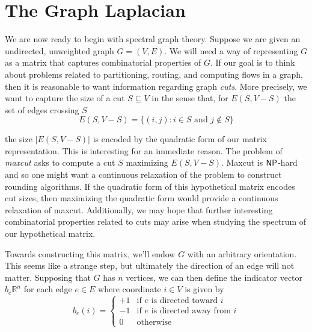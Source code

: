 
\section{The Graph Laplacian}

We are now ready to begin with spectral graph theory. Suppose we are given an undirected, unweighted graph $G = (V, E)$. We will need a way of representing $G$ as a matrix that captures combinatorial properties of $G$. If our goal is to think about problems related to partitioning, routing, and computing flows in a graph, then it is reasonable to want information regarding graph \emph{cuts}. More precisely, we want to capture the size of a cut $S \subseteq V$ in the sense that, for $E(S, V - S)$ the set of edges crossing $S$
\begin{equation*}
E(S, V - S) = \{ (i, j) : i \in S \text{ and } j \notin S \}
\end{equation*}

the size $\lvert E(S, V - S) \rvert$ is encoded by the quadratic form of our matrix representation. This is interesting for an immediate reason. The problem of \emph{maxcut} asks to compute a cut $S$ maximizing $E(S, V - S)$. Maxcut is $\mathsf{NP}$-hard and so one might want a continuous relaxation of the problem to construct rounding algorithms. If the quadratic form of this hypothetical matrix encodes cut sizes, then maximizing the quadratic form would provide a continuous relaxation of maxcut. Additionally, we may hope that further interesting combinatorial properties related to cuts may arise when studying the spectrum of our hypothetical matrix.

Towards constructing this matrix, we'll endow $G$ with an arbitrary orientation. This seems like a strange step, but ultimately the direction of an edge will not matter. Supposing that $G$ has $n$ vertices, we can then define the indicator vector $b_e \mathbb{R}^n$ for each edge $e \in E$ where coordinate $i \in V$ is given by
\begin{equation*}
b_e(i) = \begin{cases}
  +1 & \text{if } e \text{ is directed toward } i \\
  -1 & \text{if } e \text{ is directed away from } i \\
  0 & \text{otherwise}
\end{cases}
\end{equation*}

